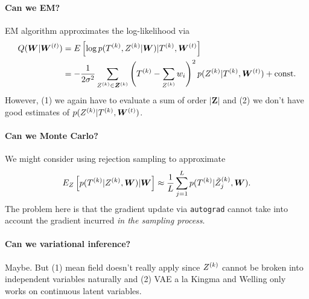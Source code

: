 \documentclass[12pt]{article}
\begin{document}
\paragraph{Can we EM?} EM algorithm approximates the log-likelihood via 
\begin{align*}
Q(\bm W|\bm W^{(t)}) &= E\left[{\log p(T^{(k)}, Z^{(k)} | \bm W) | T^{(k)}, \bm W^{(t)}}\right] \\&= -\frac{1}{2\sigma^2}\sum_{Z^{(k)} \in \bm Z^{(k)}} \left({T^{(k)} - \sum_{Z^{(k)}} w_i}\right)^2 p(Z^{(k)} | T^{(k)}, \bm W^{(t)}) + \text{const.}
\end{align*}
However, (1) we again have to evaluate a sum of order $|\bm Z|$ and (2) we don't have good estimates of $p(Z^{(k)} | T^{(k)}, \bm W^{(t)})$.

\paragraph{Can we Monte Carlo?} We might consider using rejection sampling to approximate \[
E_{Z}\left[{p(T^{(k)}| Z^{(k)}, \bm W)|\bm W}\right] \approx \frac{1}{L}\sum_{j=1}^L p(T^{(k)}| \tilde Z^{(k)}_j, \bm W).
\]
The problem here is that the gradient update via \texttt{autograd} cannot take into account the gradient incurred \emph{in the sampling process}. 

\paragraph{Can we variational inference?} Maybe. But (1) mean field doesn't really apply since $Z^{(k)}$ cannot be broken into independent variables naturally and (2) VAE a la Kingma and Welling only works on continuous latent variables.
\end{document}
